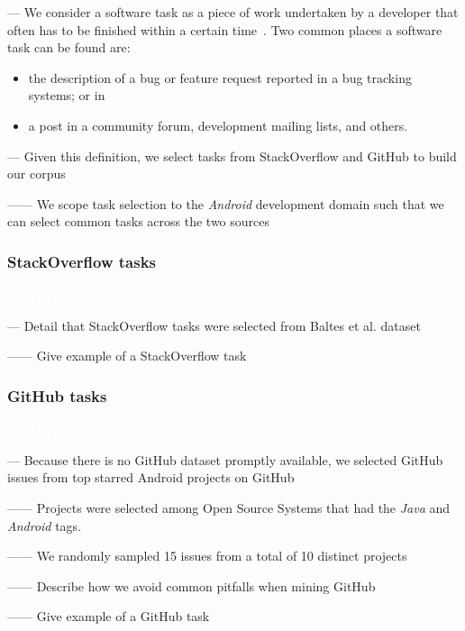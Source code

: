 --- We consider a software task as a piece of work undertaken by a developer that often has to be finished within a certain time~\cite{2004merriam}. 
Two common places a software task can be found are:

\begin{itemize}
    \item the description of a bug or feature request reported in a bug tracking systems; or in
    \item a post in a community forum, development mailing lists, and others.
\end{itemize}

\vspace{3mm}

--- Given this definition, we select tasks from StackOverflow and GitHub to build our corpus

------ We scope task selection to the \textit{Android} development domain such that we can select common tasks across the two sources \vspace{3mm}


\subsubsection{StackOverflow tasks}
\textcolor{white}{force ident} %

--- Detail that StackOverflow tasks were selected from Baltes et al. dataset~\cite{baltes2019-rep}

------ Give example of a StackOverflow task \vspace{5mm}

\subsubsection{GitHub tasks}
\textcolor{white}{force ident} %

--- Because there is no GitHub dataset promptly available, we selected GitHub issues from top starred Android projects on GitHub 

------ Projects were selected among Open Source Systems that had the \textit{Java} and \textit{Android} tags. 

------ We randomly sampled 15 issues from a total of 10 distinct projects

------ Describe how we avoid common pitfalls  when mining GitHub~\cite{kalliamvakou2014}

------ Give example of a GitHub task 

